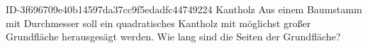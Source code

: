 \begin{exercise}
      {ID-3f696709e40b14597da37cc9f5edadfc44749224}
      {Kantholz}
  \ifproblem\problem
    Aus einem Baumstamm mit  Durchmesser soll ein quadratisches Kantholz
    mit möglichst großer Grundfläche herausgesägt werden. Wie lang sind die
    Seiten der Grundfläche?
  \fi
\end{exercise}
